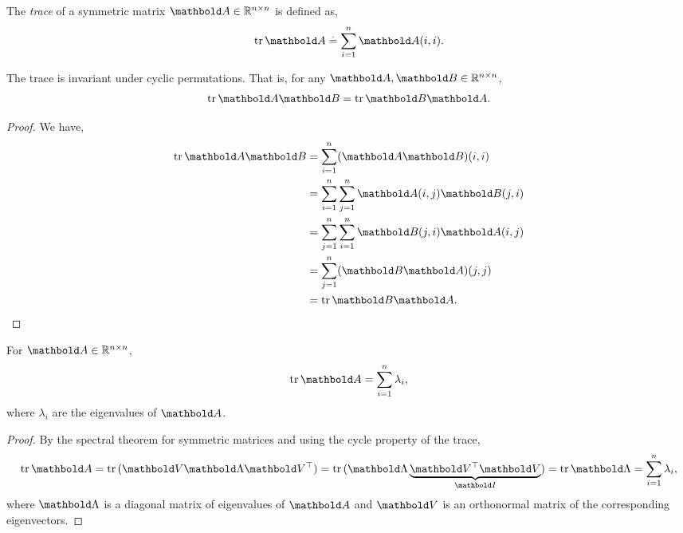 \begin{defn}[Trace] The \emph{trace} of a symmetric matrix $\mA \in \R^{n \times n}$ is defined as, \begin{align}
    \tr{\mA} \defeq \sum_{i = 1}^n \mA(i,i).
\end{align}
\end{defn}
\begin{lem} The trace is invariant under cyclic permutations. That is, for any $\mA, \mB \in \R^{n \times n}$, \begin{align}
    \tr{\mA\mB} = \tr{\mB\mA}.
\end{align}
\end{lem}
\begin{proof} We have, \begin{align*}
    \tr{\mA\mB} &= \sum_{i=1}^n (\mA\mB)(i,i) \\
    &= \sum_{i=1}^n \sum_{j=1}^n \mA(i,j)\mB(j,i) \\
    &= \sum_{j=1}^n \sum_{i=1}^n \mB(j,i)\mA(i,j) \\
    &= \sum_{j=1}^n (\mB\mA)(j,j) \\
    &= \tr{\mB\mA}. \qedhere
\end{align*}
\end{proof}
\begin{lem} For $\mA \in \R^{n \times n}$, \begin{align}
    \tr{\mA} = \sum_{i=1}^n \lambda_i,
\end{align} where $\lambda_i$ are the eigenvalues of $\mA$.
\end{lem}
\begin{proof} By the spectral theorem for symmetric matrices and using the cycle property of the trace, \begin{align*}
    \tr{\mA} = \tr{(\mV\mLambda\trans{\mV})} = \tr{(\mLambda\underbrace{\trans{\mV}\mV}_{\mI})} = \tr{\mLambda} = \sum_{i=1}^n \lambda_i,
\end{align*} where $\mLambda$ is a diagonal matrix of eigenvalues of $\mA$ and $\mV$ is an orthonormal matrix of the corresponding eigenvectors.
\end{proof}

